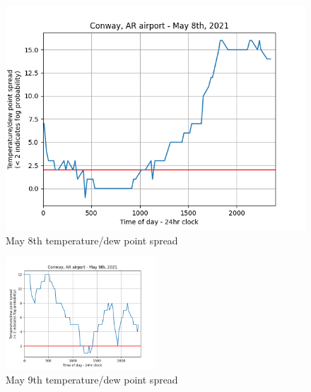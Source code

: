 \documentclass{article}
\begin{document}
\begin{figure}[h]
\begin{center}
\includegraphics[width=1\textwidth]{May8th.png}
\end{center}
\caption{May 8th temperature/dew point spread}
\label{May 8th}
\end{figure}

\begin{figure}[h]
\begin{center}
\includegraphics[width=0.5\textwidth]{May9th.png}
\end{center}
\caption{May 9th temperature/dew point spread}
\label{May 9th}
\end{figure}
\end{document}
